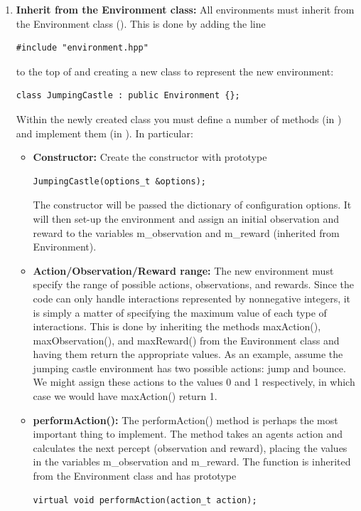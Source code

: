 \documentclass[a4paper,11pt]{article}
\begin{document}
\begin{enumerate}
\item {\bf Inherit from the Environment class:} All environments must inherit from the Environment class (). This is done by adding the line
  \begin{lstlisting}[frame=single]
#include "environment.hpp"
  \end{lstlisting}
  to the top of  and creating a new class to represent the new environment:
  \begin{lstlisting}[frame=single]
class JumpingCastle : public Environment {};
  \end{lstlisting}
  Within the newly created class you must define a number of methods (in ) and implement them (in ). In particular:
  \begin{itemize}
  \item {\bf Constructor:} Create the constructor with prototype
    \begin{lstlisting}[frame=single]
JumpingCastle(options_t &options);      
    \end{lstlisting}
    The constructor will be passed the dictionary of configuration options. It will then set-up the environment and assign an initial observation and reward to the variables m\_observation and m\_reward (inherited from Environment).

  \item {\bf Action/Observation/Reward range:} The new environment must specify the range of possible actions, observations, and rewards. Since the code can only handle interactions represented by nonnegative integers, it is simply a matter of specifying the maximum value of each type of interactions. This is done by inheriting the methods maxAction(), maxObservation(), and maxReward() from the Environment class and having them return the appropriate values. As an example, assume the jumping castle environment has two possible actions: jump and bounce. We might assign these actions to the values 0 and 1 respectively, in which case we would have maxAction() return 1.

  \item {\bf performAction():} The performAction() method is perhaps the most important thing to implement. The method takes an agents action and calculates the next percept (observation and reward), placing the values in the variables m\_observation and m\_reward. The function is inherited from the Environment class and has prototype
    \begin{lstlisting}[frame=single]
virtual void performAction(action_t action);
    \end{lstlisting}


\end{itemize}
\end{enumerate}
\end{document}
